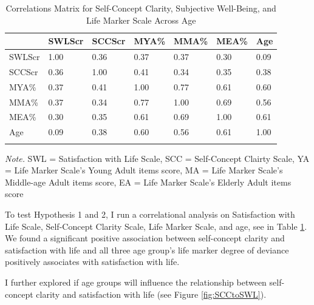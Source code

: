\documentclass[
  man,floatsintext]{apa6}
\begin{document}
\begin{table}[tbp]

\begin{center}
\begin{threeparttable}

\caption{\label{tab:matrix}Correlations Matrix for Self-Concept Clarity, Subjective Well-Being, and Life Marker Scale Across Age}

\begin{tabular}{lllllll}
\toprule
 & \multicolumn{1}{c}{SWLScr} & \multicolumn{1}{c}{SCCScr} & \multicolumn{1}{c}{MYA\%} & \multicolumn{1}{c}{MMA\%} & \multicolumn{1}{c}{MEA\%} & \multicolumn{1}{c}{Age}\\
\midrule
SWLScr & 1.00 & 0.36 & 0.37 & 0.37 & 0.30 & 0.09\\
SCCScr & 0.36 & 1.00 & 0.41 & 0.34 & 0.35 & 0.38\\
MYA\% & 0.37 & 0.41 & 1.00 & 0.77 & 0.61 & 0.60\\
MMA\% & 0.37 & 0.34 & 0.77 & 1.00 & 0.69 & 0.56\\
MEA\% & 0.30 & 0.35 & 0.61 & 0.69 & 1.00 & 0.61\\
Age & 0.09 & 0.38 & 0.60 & 0.56 & 0.61 & 1.00\\
\bottomrule
\addlinespace
\end{tabular}

\begin{tablenotes}[para]
\normalsize{\textit{Note.} SWL = Satisfaction with Life Scale, SCC = Self-Concept Clairty Scale, YA = Life Marker Scale's Young Adult items score, MA = Life Marker Scale's Middle-age Adult items score, EA = Life Marker Scale's Elderly Adult items score}
\end{tablenotes}

\end{threeparttable}
\end{center}

\end{table}

To test Hypothesis 1 and 2, I run a correlational analysis on Satisfaction with Life Scale, Self-Concept Clarity Scale, Life Marker Scale, and age, see in Table \ref{tab:matrix}. We found a significant positive association between self-concept clarity and satisfaction with life and all three age group's life marker degree of deviance positively associates with satisfaction with life.

I further explored if age groups will influence the relationship between self-concept clarity and satisfaction with life (see Figure \ref{fig:SCCtoSWL}).
\end{document}
